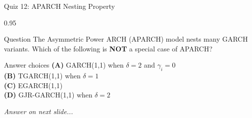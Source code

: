 \documentclass[9pt, aspectratio=169, t]{beamer}
\begin{document}
\begin{frame}{Quiz 12: APARCH Nesting Property}
    \begin{cminipage}{0.95\textwidth}
    \begin{alertblock}{Question}
        The Asymmetric Power ARCH (APARCH) model nests many GARCH variants. Which of the following is \textbf{NOT} a special case of APARCH?
    \end{alertblock}

    \vspace{0.4cm}

    \begin{block}{Answer choices}
        \textcolor{MainBlue}{\textbf{(A)}} GARCH(1,1) when $\delta = 2$ and $\gamma_i = 0$\\[3pt]
        \textcolor{MainBlue}{\textbf{(B)}} TGARCH(1,1) when $\delta = 1$\\[3pt]
        \textcolor{MainBlue}{\textbf{(C)}} EGARCH(1,1)\\[3pt]
        \textcolor{MainBlue}{\textbf{(D)}} GJR-GARCH(1,1) when $\delta = 2$
    \end{block}

    \vspace{0.5cm}

    \begin{center}
        \textit{Answer on next slide...}
    \end{center}
    \end{cminipage}
\end{frame}
\end{document}

